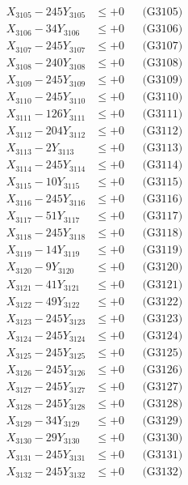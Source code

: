 \documentclass[a4paper,10pt]{article}
\begin{document}
{\begin{align}
X_{3105} - 245Y_{3105} &\leq +0 && \text{(G3105)} \\
X_{3106} - 34Y_{3106} &\leq +0 && \text{(G3106)} \\
X_{3107} - 245Y_{3107} &\leq +0 && \text{(G3107)} \\
X_{3108} - 240Y_{3108} &\leq +0 && \text{(G3108)} \\
X_{3109} - 245Y_{3109} &\leq +0 && \text{(G3109)} \\
X_{3110} - 245Y_{3110} &\leq +0 && \text{(G3110)} \\
\allowbreak
X_{3111} - 126Y_{3111} &\leq +0 && \text{(G3111)} \\
X_{3112} - 204Y_{3112} &\leq +0 && \text{(G3112)} \\
X_{3113} - 2Y_{3113} &\leq +0 && \text{(G3113)} \\
X_{3114} - 245Y_{3114} &\leq +0 && \text{(G3114)} \\
X_{3115} - 10Y_{3115} &\leq +0 && \text{(G3115)} \\
X_{3116} - 245Y_{3116} &\leq +0 && \text{(G3116)} \\
X_{3117} - 51Y_{3117} &\leq +0 && \text{(G3117)} \\
X_{3118} - 245Y_{3118} &\leq +0 && \text{(G3118)} \\
X_{3119} - 14Y_{3119} &\leq +0 && \text{(G3119)} \\
X_{3120} - 9Y_{3120} &\leq +0 && \text{(G3120)} \\
\allowbreak
X_{3121} - 41Y_{3121} &\leq +0 && \text{(G3121)} \\
X_{3122} - 49Y_{3122} &\leq +0 && \text{(G3122)} \\
X_{3123} - 245Y_{3123} &\leq +0 && \text{(G3123)} \\
X_{3124} - 245Y_{3124} &\leq +0 && \text{(G3124)} \\
X_{3125} - 245Y_{3125} &\leq +0 && \text{(G3125)} \\
X_{3126} - 245Y_{3126} &\leq +0 && \text{(G3126)} \\
X_{3127} - 245Y_{3127} &\leq +0 && \text{(G3127)} \\
X_{3128} - 245Y_{3128} &\leq +0 && \text{(G3128)} \\
X_{3129} - 34Y_{3129} &\leq +0 && \text{(G3129)} \\
X_{3130} - 29Y_{3130} &\leq +0 && \text{(G3130)} \\
\allowbreak
X_{3131} - 245Y_{3131} &\leq +0 && \text{(G3131)} \\
X_{3132} - 245Y_{3132} &\leq +0 && \text{(G3132)} \\

\end{align}}
\end{document}
